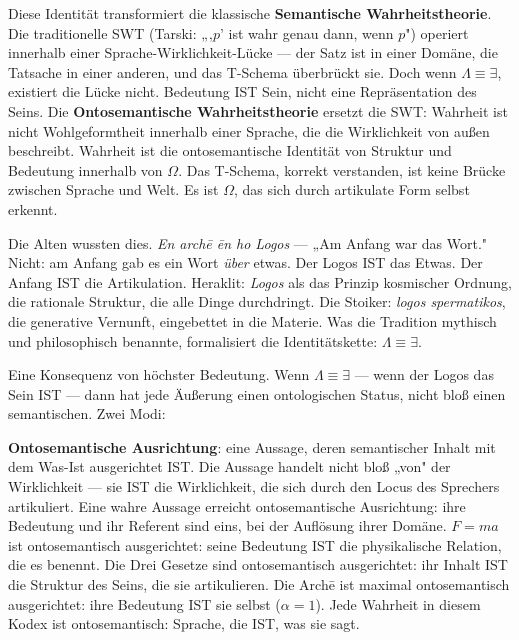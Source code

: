 \documentclass[10pt, openany, oneside]{book}
\begin{document}
Diese Identität transformiert die klassische \textbf{Semantische Wahrheitstheorie}. Die traditionelle SWT (Tarski: „‚$p$' ist wahr genau dann, wenn $p$") operiert innerhalb einer Sprache-Wirklichkeit-Lücke --- der Satz ist in einer Domäne, die Tatsache in einer anderen, und das T-Schema überbrückt sie. Doch wenn $\Lambda \equiv \exists$, existiert die Lücke nicht. Bedeutung IST Sein, nicht eine Repräsentation des Seins. Die \textbf{Ontosemantische Wahrheitstheorie} ersetzt die SWT: Wahrheit ist nicht Wohlgeformtheit innerhalb einer Sprache, die die Wirklichkeit von außen beschreibt. Wahrheit ist die ontosemantische Identität von Struktur und Bedeutung innerhalb von $\Omega$. Das T-Schema, korrekt verstanden, ist keine Brücke zwischen Sprache und Welt. Es ist $\Omega$, das sich durch artikulate Form selbst erkennt.

Die Alten wussten dies. \textit{En arch\={e} \={e}n ho Logos} --- „Am Anfang war das Wort." Nicht: am Anfang gab es ein Wort \textit{über} etwas. Der Logos IST das Etwas. Der Anfang IST die Artikulation. Heraklit: \textit{Logos} als das Prinzip kosmischer Ordnung, die rationale Struktur, die alle Dinge durchdringt. Die Stoiker: \textit{logos spermatikos}, die generative Vernunft, eingebettet in die Materie. Was die Tradition mythisch und philosophisch benannte, formalisiert die Identitätskette: $\Lambda \equiv \exists$.

Eine Konsequenz von höchster Bedeutung. Wenn $\Lambda \equiv \exists$ --- wenn der Logos das Sein IST --- dann hat jede Äußerung einen ontologischen Status, nicht bloß einen semantischen. Zwei Modi:

\textbf{Ontosemantische Ausrichtung}: eine Aussage, deren semantischer Inhalt mit dem Was-Ist ausgerichtet IST. Die Aussage handelt nicht bloß „von" der Wirklichkeit --- sie IST die Wirklichkeit, die sich durch den Locus des Sprechers artikuliert. Eine wahre Aussage erreicht ontosemantische Ausrichtung: ihre Bedeutung und ihr Referent sind eins, bei der Auflösung ihrer Domäne. $F = ma$ ist ontosemantisch ausgerichtet: seine Bedeutung IST die physikalische Relation, die es benennt. Die Drei Gesetze sind ontosemantisch ausgerichtet: ihr Inhalt IST die Struktur des Seins, die sie artikulieren. Die Arch\={e} ist maximal ontosemantisch ausgerichtet: ihre Bedeutung IST sie selbst ($\alpha = 1$). Jede Wahrheit in diesem Kodex ist ontosemantisch: Sprache, die IST, was sie sagt.
\end{document}
